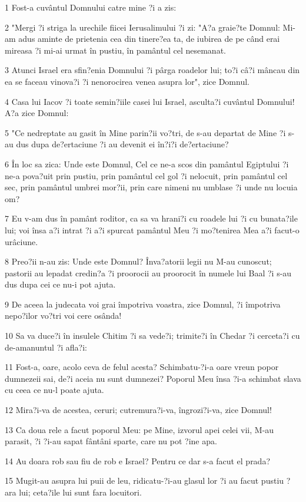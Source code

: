 \par 1 Fost-a cuvântul Domnului catre mine ?i a zis:
\par 2 "Mergi ?i striga la urechile fiicei Ierusalimului ?i zi: "A?a graie?te Domnul: Mi-am adus aminte de prietenia cea din tinere?ea ta, de iubirea de pe când erai mireasa ?i mi-ai urmat în pustiu, în pamântul cel nesemanat.
\par 3 Atunci Israel era sfin?enia Domnului ?i pârga roadelor lui; to?i câ?i mâncau din ea se faceau vinova?i ?i nenorocirea venea asupra lor", zice Domnul.
\par 4 Casa lui Iacov ?i toate semin?iile casei lui Israel, asculta?i cuvântul Domnului! A?a zice Domnul:
\par 5 "Ce nedreptate au gasit în Mine parin?ii vo?tri, de s-au departat de Mine ?i s-au dus dupa de?ertaciune ?i au devenit ei în?i?i de?ertaciune?
\par 6 În loc sa zica: Unde este Domnul, Cel ce ne-a scos din pamântul Egiptului ?i ne-a pova?uit prin pustiu, prin pamântul cel gol ?i nelocuit, prin pamântul cel sec, prin pamântul umbrei mor?ii, prin care nimeni nu umblase ?i unde nu locuia om?
\par 7 Eu v-am dus în pamânt roditor, ca sa va hrani?i cu roadele lui ?i cu bunata?ile lui; voi însa a?i intrat ?i a?i spurcat pamântul Meu ?i mo?tenirea Mea a?i facut-o urâciune.
\par 8 Preo?ii n-au zis: Unde este Domnul? Înva?atorii legii nu M-au cunoscut; pastorii au lepadat credin?a ?i proorocii au proorocit în numele lui Baal ?i s-au dus dupa cei ce nu-i pot ajuta.
\par 9 De aceea la judecata voi grai împotriva voastra, zice Domnul, ?i împotriva nepo?ilor vo?tri voi cere osânda!
\par 10 Sa va duce?i în insulele Chitim ?i sa vede?i; trimite?i în Chedar ?i cerceta?i cu de-amanuntul ?i afla?i:
\par 11 Fost-a, oare, acolo ceva de felul acesta? Schimbatu-?i-a oare vreun popor dumnezeii sai, de?i aceia nu sunt dumnezei? Poporul Meu însa ?i-a schimbat slava cu ceea ce nu-l poate ajuta.
\par 12 Mira?i-va de acestea, ceruri; cutremura?i-va, îngrozi?i-va, zice Domnul!
\par 13 Ca doua rele a facut poporul Meu: pe Mine, izvorul apei celei vii, M-au parasit, ?i ?i-au sapat fântâni sparte, care nu pot ?ine apa.
\par 14 Au doara rob sau fiu de rob e Israel? Pentru ce dar s-a facut el prada?
\par 15 Mugit-au asupra lui puii de leu, ridicatu-?i-au glasul lor ?i au facut pustiu ?ara lui; ceta?ile lui sunt fara locuitori.
